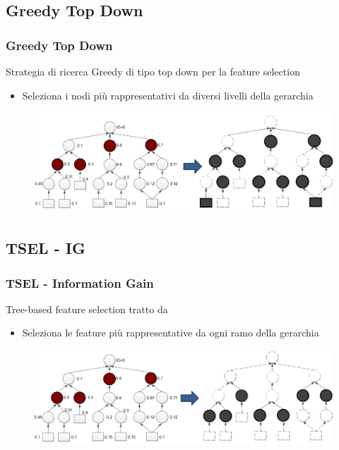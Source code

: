 \documentclass{beamer}
\begin{document}
\subsection{Greedy Top Down}
\begin{frame}
	\frametitle{Greedy Top Down}
	Strategia di ricerca Greedy di tipo top down per la feature selection
	\begin{itemize}
		\item Seleziona i nodi più rappresentativi da diversi livelli della gerarchia
	\end{itemize}
	\begin{figure}[tbph]
		\centering
		\vspace{-0.5cm}
		\includegraphics[width=0.9\linewidth]{figure/Mannheim/Greedy_Top_Down.png}
		\label{fig:GreedyTopDown}
	\end{figure}
\end{frame}

\subsection{TSEL - IG}
\begin{frame}
	\frametitle{TSEL - Information Gain}
	Tree-based feature selection tratto da \cite{jeong2013feature}
	\begin{itemize}
		\item Seleziona le feature più rappresentative da ogni ramo della gerarchia
	\end{itemize}
	\begin{figure}[tbph]
		\centering
		\vspace{-0.2cm}
		\includegraphics[width=0.9\linewidth]{figure/Mannheim/TSEL.png}
		\label{fig:TSEL}
	\end{figure}
\end{frame}
\end{document}
